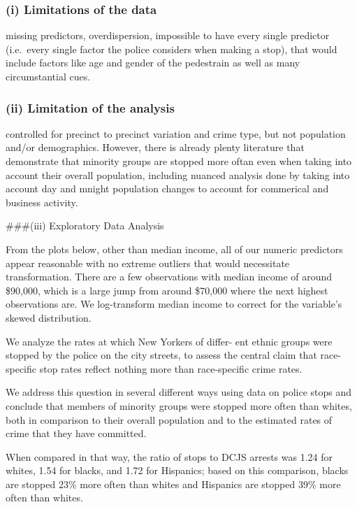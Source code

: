 \documentclass[]{article}
\begin{document}
\hypertarget{i-limitations-of-the-data}{%
\subsubsection{(i) Limitations of the
data}\label{i-limitations-of-the-data}}

missing predictors, overdispersion, impossible to have every single
predictor (i.e.~every single factor the police considers when making a
stop), that would include factors like age and gender of the pedestrain
as well as many circumstantial cues.

\hypertarget{ii-limitation-of-the-analysis}{%
\subsubsection{(ii) Limitation of the
analysis}\label{ii-limitation-of-the-analysis}}

controlled for precinct to precinct variation and crime type, but not
population and/or demographics. However, there is already plenty
literature that demonstrate that minority groups are stopped more oftan
even when taking into account their overall population, including
nuanced analysis done by taking into account day and mnight population
changes to account for commerical and business activity.

\#\#\#(iii) Exploratory Data Analysis

From the plots below, other than median income, all of our numeric
predictors appear reasonable with no extreme outliers that would
necessitate transformation. There are a few observations with median
income of around \$90,000, which is a large jump from around \$70,000
where the next highest observations are. We log-transform median income
to correct for the variable's skewed distribution.

We analyze the rates at which New Yorkers of differ- ent ethnic groups
were stopped by the police on the city streets, to assess the central
claim that race-specific stop rates reflect nothing more than
race-specific crime rates.

We address this question in several different ways using data on police
stops and conclude that members of minority groups were stopped more
often than whites, both in comparison to their overall population and to
the estimated rates of crime that they have committed.

When compared in that way, the ratio of stops to DCJS arrests was 1.24
for whites, 1.54 for blacks, and 1.72 for Hispanics; based on this
comparison, blacks are stopped 23\% more often than whites and Hispanics
are stopped 39\% more often than whites.
\end{document}

